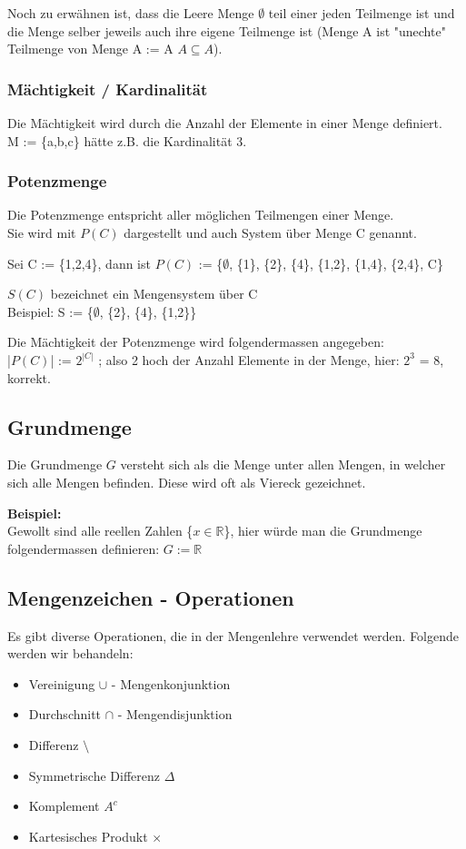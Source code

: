 \documentclass[a4paper,12pt]{article}
\begin{document}
Noch zu erwähnen ist, dass die Leere Menge $\emptyset$ teil einer jeden Teilmenge ist und die Menge selber jeweils auch ihre eigene Teilmenge ist (Menge A ist "unechte" Teilmenge von Menge A := A $A \subseteq A$).

\subsubsection{Mächtigkeit / Kardinalität}
Die Mächtigkeit wird durch die Anzahl der Elemente in einer Menge definiert. \\
M := \{a,b,c\} hätte z.B. die Kardinalität 3.

\subsubsection{Potenzmenge}
Die Potenzmenge entspricht aller möglichen Teilmengen einer Menge. \\
Sie wird mit \( P(C) \) dargestellt und auch System über Menge C genannt.

Sei C := \{1,2,4\}, dann ist \( P(C) \) := \{$\emptyset$,  \{1\}, \{2\}, \{4\}, \{1,2\}, \{1,4\}, \{2,4\}, C\}

\( S(C) \) bezeichnet ein Mengensystem über C \\
Beispiel: S := \{$\emptyset$,  \{2\}, \{4\}, \{1,2\}\}

Die Mächtigkeit der Potenzmenge wird folgendermassen angegeben: \\
|\( P(C) \)| := $2^{|C|}$ ; also 2 hoch der Anzahl Elemente in der Menge, hier: $2^{3}$ = 8, korrekt.

\subsection{Grundmenge}
Die Grundmenge $G$ versteht sich als die Menge unter allen Mengen, in welcher sich alle Mengen befinden. Diese wird oft als Viereck gezeichnet.

\textbf{Beispiel:} \\
Gewollt sind alle reellen Zahlen \{$x \in \mathbb{R}$\}, hier würde man die Grundmenge folgendermassen definieren: $G := \mathbb{R}$

\subsection{Mengenzeichen - Operationen}
Es gibt diverse Operationen, die in der Mengenlehre verwendet werden. Folgende werden wir behandeln:
\begin{itemize}
  \item Vereinigung $\cup$ - Mengenkonjunktion
  \item Durchschnitt $\cap$ - Mengendisjunktion
  \item Differenz $\setminus$
  \item Symmetrische Differenz $\Delta$
  \item Komplement $A^{c}$
  \item Kartesisches Produkt $\times$
\end{itemize}
\end{document}
